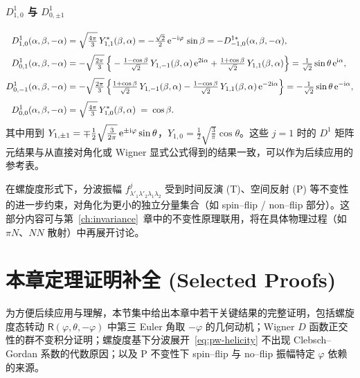 \paragraph{$D^{1}_{1,0}$ 与 $D^{1}_{0,\pm 1}$}
\begin{align}
  D^{1}_{1,0}(\alpha,\beta,-\alpha)
  &= \sqrt{\tfrac{4\pi}{3}}\,Y^*_{1,1}(\beta,\alpha)
   = -\tfrac{\sqrt{2}}{2}\,\mathrm{e}^{-\mathrm{i}\varphi}\,\sin\beta
   = -D^{1*}_{-1,0}(\alpha,\beta,-\alpha), \\[3pt]
  D^{1}_{0,1}(\alpha,\beta,-\alpha)
  &= -\sqrt{\tfrac{2\pi}{3}}\,\Big\{-\tfrac{1-\cos\beta}{\sqrt{2}}\,Y_{1,-1}(\beta,\alpha)\,\mathrm{e}^{2\mathrm{i}\alpha}
     + \tfrac{1+\cos\beta}{\sqrt{2}}\,Y_{1,1}(\beta,\alpha)\Big\}
   = \tfrac{1}{\sqrt{2}}\sin\theta\,\mathrm{e}^{\mathrm{i}\alpha}, \\[3pt]
  D^{1}_{0,-1}(\alpha,\beta,-\alpha)
  &= -\sqrt{\tfrac{2\pi}{3}}\,\Big\{\tfrac{1+\cos\beta}{\sqrt{2}}\,Y_{1,-1}(\beta,\alpha)
     - \tfrac{1-\cos\beta}{\sqrt{2}}\,Y_{1,1}(\beta,\alpha)\,\mathrm{e}^{-2\mathrm{i}\alpha}\Big\}
   = -\tfrac{1}{\sqrt{2}}\sin\theta\,\mathrm{e}^{-\mathrm{i}\alpha}, \\[3pt]
  D^{1}_{0,0}(\alpha,\beta,-\alpha)
  &= \sqrt{\tfrac{4\pi}{3}}\,Y^*_{1,0}(\beta,\alpha) \;=\; \cos\beta.
\end{align}
其中用到 $Y_{1,\pm 1}=\mp \tfrac{1}{2}\sqrt{\tfrac{3}{2\pi}}\,\mathrm{e}^{\pm\mathrm{i}\varphi}\sin\theta$，$Y_{1,0}=\tfrac{1}{2}\sqrt{\tfrac{3}{\pi}}\cos\theta$。这些 $j=1$ 时的 $D^{1}$ 矩阵元结果与从直接对角化或 Wigner 显式公式得到的结果一致，可以作为后续应用的参考表。

\begin{remark}
在螺旋度形式下，分波振幅 $f^{j}_{\lambda'_1\lambda'_2\lambda_1\lambda_2}$ 受到时间反演 (T)、空间反射 (P) 等不变性的进一步约束，对角化为更小的独立分量集合（如 spin–flip / non–flip 部分）。这部分内容可与第~\ref{ch:invariance}~章中的不变性原理联用，将在具体物理过程（如 $\pi N$、$NN$ 散射）中再展开讨论。
\end{remark}

\section{本章定理证明补全 (Selected Proofs)}
\label{sec:morespin-proofs}

为方便后续应用与理解，本节集中给出本章中若干关键结果的完整证明，包括螺旋度态转动 $\mathsf R(\varphi,\theta,-\varphi)$ 中第三 Euler 角取 $-\varphi$ 的几何动机；Wigner $D$ 函数正交性的群不变积分证明；螺旋度基下分波展开~\eqref{eq:pw-helicity} 不出现 Clebsch--Gordan 系数的代数原因；以及 P 不变性下 spin--flip 与 no--flip 振幅特定 $\varphi$ 依赖的来源。


